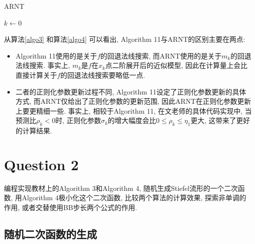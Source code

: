 \documentclass[UTF8]{ctexart}
\begin{document}
\begin{algorithm}[htb]
    \caption{ARNT}\label{algo4}
    $k\leftarrow 0$\;
    \While{终止条件不成立}{
        {\color{purple}{使用RNewton}}得到步长$d_k$\;
        初始步长为$1$, 使用{\color{purple}{关于$m_k$}}的回退法线搜索得到步长$t_k$和中间点$y_k=\textbf{R}_{x_k}(t_kd_k)$\;
        计算预测比$\rho_k\leftarrow\frac{f(y_k)-f(x_k)}{m_k(t_k d_k)-f(x_k)}$\;
        更新正则参数: 若$\rho_k\geq \eta_2$, 则{\color{purple}{$\sigma_{k+1}\in(0,\gamma_0\sigma_k]$}}; 若$\eta_2\ge\rho_k\geq \eta_1$, 则{\color{purple}{$\sigma_{k+1}\in[\gamma_0\sigma_k,\gamma_1\sigma_k]$}}; 若$\rho_k\le \eta_1$, 则{\color{purple}{$\sigma_{k+1}\in[\gamma_1\sigma_k,\gamma_2\sigma_k]$}}\; 
        更新迭代点: 若$\rho_k\geq \eta_1$, 则$x_{k+1}\leftarrow y_k$; 若$\rho_k\le \eta_1$, 则$x_{k+1}\leftarrow x_k$\; 
        $k\leftarrow k+1$\;
    }
\end{algorithm}

从算法\ref{algo3} 和算法\ref{algo4} 可以看出, Algorithm 11与ARNT的区别主要在两点: 
\begin{itemize}
    \item Algorithm 11使用的是关于$f$的回退法线搜索, 而ARNT使用的是关于$m_k$的回退法线搜索. 事实上, $m_k$是$f$在$x_k$点二阶展开后的近似模型, 因此在计算量上会比直接计算关于$f$的回退法线搜索要略低一点. 
    \item 二者的正则化参数更新过程不同, Algorithm 11设定了正则化参数更新的具体方式, 而ARNT仅给出了正则化参数的更新范围, 因此ARNT在正则化参数更新上要更精细一些. 事实上, 相较于Algorithm 11, 在文老师的具体代码实现中, 当预测比$\rho_k<0$时, 正则化参数$\sigma_k$的增大幅度会比$0\leq\rho_k\le \eta_1$更大, 这带来了更好的计算结果. 
\end{itemize}

\section{Question 2}

编程实现教材上的Algorithm 3和Algorithm 4, 随机生成Stiefel流形的一个二次函数, 用Algorithm 4极小化这个二次函数, 比较两个算法的计算效果, 探索非单调的作用, 或者交替使用BB步长两个公式的作用. 

\subsection{随机二次函数的生成}
\end{document}
